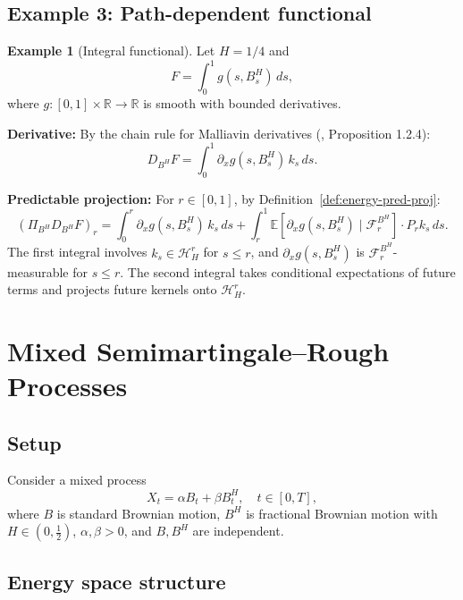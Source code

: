 \documentclass[11pt,a4paper]{article}
\theoremstyle{plain}
\theoremstyle{definition}
\newtheorem{example}[theorem]{Example}
\theoremstyle{remark}
\newcommand{\R}{\mathbb{R}}
\newcommand{\E}{\mathbb{E}}
\newcommand{\HH}{\mathcal{H}_H}
\begin{document}
\subsection{Example 3: Path-dependent functional}

\begin{example}[Integral functional]\label{ex:path-dep}
Let $H = 1/4$ and
\[
F = \int_0^1 g(s, B^H_s) \, ds,
\]
where $g: [0,1] \times \R \to \R$ is smooth with bounded derivatives.

\textbf{Derivative:} By the chain rule for Malliavin derivatives (\cite{Nualart06}, Proposition 1.2.4):
\[
D_{B^H} F = \int_0^1 \partial_x g(s, B^H_s) \, k_s \, ds.
\]

\textbf{Predictable projection:} For $r \in [0, 1]$, by Definition~\ref{def:energy-pred-proj}:
\[
(\Pi_{B^H} D_{B^H} F)_r = \int_0^r \partial_x g(s, B^H_s) \, k_s \, ds + \int_r^1 \E[\partial_x g(s, B^H_s) \mid \mathcal{F}_r^{B^H}] \cdot P_r k_s \, ds.
\]
The first integral involves $k_s \in \HH^r$ for $s \leq r$, and $\partial_x g(s, B^H_s)$ is $\mathcal{F}_r^{B^H}$-measurable for $s \leq r$. The second integral takes conditional expectations of future terms and projects future kernels onto $\HH^r$.
\end{example}

\section{Mixed Semimartingale--Rough Processes}\label{sec:mixed}

\subsection{Setup}

Consider a mixed process
\begin{equation}\label{eq:mixed-process}
X_t = \alpha B_t + \beta B^H_t, \quad t \in [0, T],
\end{equation}
where $B$ is standard Brownian motion, $B^H$ is fractional Brownian motion with $H \in (0, \frac{1}{2})$, $\alpha, \beta > 0$, and $B, B^H$ are independent.

\subsection{Energy space structure}
\end{document}
